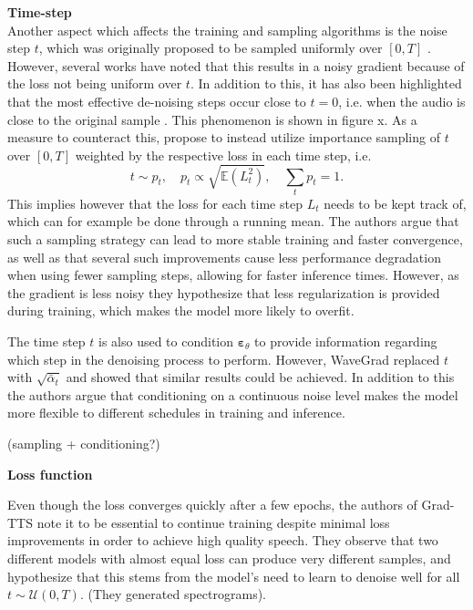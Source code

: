 \documentclass{article}
\begin{document}
\textbf{Time-step} \\
Another aspect which affects the training and sampling algorithms is the noise step $t$, which was originally proposed to be sampled uniformly over $[0, T]$ \cite{ho2020denoising}. However, several works have noted that this results in a noisy gradient because of the loss not being uniform over $t$. In addition to this, it has also been highlighted that the most effective de-noising steps occur close to $t=0$, i.e. when the audio is close to the original sample \cite{kong2020diffwave, nichol2021improved}. This phenomenon is shown in figure x. As a measure to counteract this, \cite{nichol2021improved} propose to instead utilize importance sampling of $t$ over $[0, T]$ weighted by the respective loss in each time step, i.e. 
\begin{equation}
    t \sim p_t, \quad p_t \propto \sqrt{\mathbb{E}(L_t^2)}, \quad \sum_t p_t = 1.
\end{equation}
This implies however that the loss for each time step $L_t$ needs to be kept track of, which can for example be done through a running mean. The authors argue that such a sampling strategy can lead to more stable training and faster convergence, as well as that several such improvements cause less performance degradation when using fewer sampling steps, allowing for faster inference times. However, as the gradient is less noisy they hypothesize that less regularization is provided during training, which makes the model more likely to overfit.

The time step $t$ is also used to condition $\bm{\varepsilon}_{\theta}$ to provide information regarding which step in the denoising process to perform. However, WaveGrad \cite{chen2020wavegrad} replaced $t$ with $\sqrt{\bar{\alpha}_t}$ and showed that similar results could be achieved. In addition to this the authors argue that conditioning on a continuous noise level makes the model more flexible to different schedules in training and inference.

(sampling + conditioning?)

\textbf{Loss function}







Even though the loss converges quickly after a few epochs, the authors of Grad-TTS \cite{popov2021grad} note it to be essential to continue training despite minimal loss improvements in order to achieve high quality speech. They observe that two different models with almost equal loss can produce very different samples, and hypothesize that this stems from the model's need to learn to denoise well for all $t \sim \mathcal{U}(0, T)$. (They generated spectrograms). 
\end{document}
